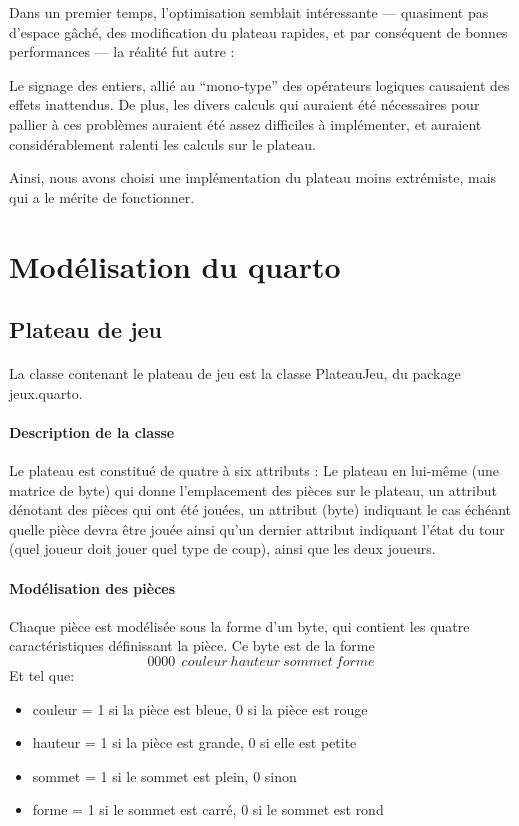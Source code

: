 \documentclass{article}
\begin{document}
Dans un premier temps, l'optimisation semblait intéressante ---
quasiment pas d'espace gâché, des modification du plateau rapides, et
par conséquent de bonnes performances --- la réalité fut autre :


Le signage des entiers, allié au ``mono-type'' des opérateurs logiques 
causaient des effets inattendus.
De plus, les divers calculs qui
auraient été nécessaires pour pallier à ces problèmes auraient été
assez difficiles à implémenter, et auraient considérablement ralenti
les calculs sur le plateau.


Ainsi, nous avons choisi une implémentation du plateau moins
extrémiste, mais qui a le mérite de fonctionner.

\section{Modélisation du quarto}
\subsection{Plateau de jeu}
\paragraph{}
La classe contenant le plateau de jeu est la classe PlateauJeu, du
package jeux.quarto.

\paragraph{Description de la classe}
Le plateau est constitué de quatre à six attributs : Le plateau en lui-même (une
matrice de byte) qui donne l'emplacement des pièces sur le plateau, 
un attribut dénotant des pièces qui ont été jouées, un attribut (byte)
indiquant le cas échéant quelle pièce devra être jouée ainsi qu'un dernier
attribut indiquant l'état du tour (quel joueur doit jouer quel type de
coup), ainsi que les deux joueurs.

\paragraph{Modélisation des pièces}
Chaque pièce est modélisée sous la forme d'un byte, qui contient les
quatre caractéristiques définissant la pièce. Ce byte est de la forme 
\[ 0000~~couleur~hauteur~sommet~forme \]
Et tel que:
\begin{itemize}
\item couleur = 1 si la pièce est bleue, 0 si la pièce est rouge
\item hauteur = 1 si la pièce est grande, 0 si elle est petite
\item sommet = 1 si le sommet est plein, 0 sinon
\item forme = 1 si le sommet est carré, 0 si le sommet est rond
\end{itemize}
\end{document}
